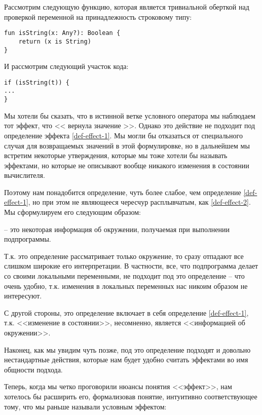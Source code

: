 Рассмотрим следующую функцию, которая является тривиальной оберткой над проверкой переменной на принадлежность строковому типу:

\begin{verbatim}
fun isString(x: Any?): Boolean {
    return (x is String)
}
\end{verbatim}

И рассмотрим следующий участок кода:

\begin{verbatim}
if (isString(t)) {
...
}
\end{verbatim}

Мы хотели бы сказать, что в истинной ветке условного оператора мы наблюдаем тот эффект, что << вернула значение >>. Однако это действие не подходит под определение эффекта \ref{def-effect-1}. Мы могли бы отказаться от специального случая для возвращаемых значений в этой формулировке, но в дальнейшем мы встретим некоторые утверждения, которые мы тоже хотели бы называть эффектами, но которые не описывают вообще никакого изменения в состоянии вычислителя.

Поэтому нам понадобится определение, чуть более слабое, чем определение \ref{def-effect-1}, но при этом не являющееся чересчур расплывчатым, как \ref{def-effect-2}. Мы сформулируем его следующим образом:

\begin{definition}
    \label{def-effect}
     -- это некоторая информация об окружении, получаемая при выполнении подпрограммы.
\end{definition}

Т.к. это определение рассматривает только окружение, то сразу отпадают все слишком широкие его интерпретации. В частности, все, что подпрограмма делает со своими локальными переменными, не подходит под это определение -- что очень удобно, т.к. изменения в локальных переменных нас никоим образом не интересуют.

С другой стороны, это определение включает в себя определение \ref{def-effect-1}, т.к. <<изменение в состоянии>>, несомненно, является <<информацией об окружении>>.

Наконец, как мы увидим чуть позже, под это определение подходят и довольно нестандартные действия, которые нам будет удобно считать эффектами во имя общности подхода.

\bigskip

Теперь, когда мы четко проговорили нюансы понятия <<эффект>>, нам хотелось бы расширить его, формализовав понятие, интуитивно соответствующее тому, что мы раньше называли условным эффектом:

